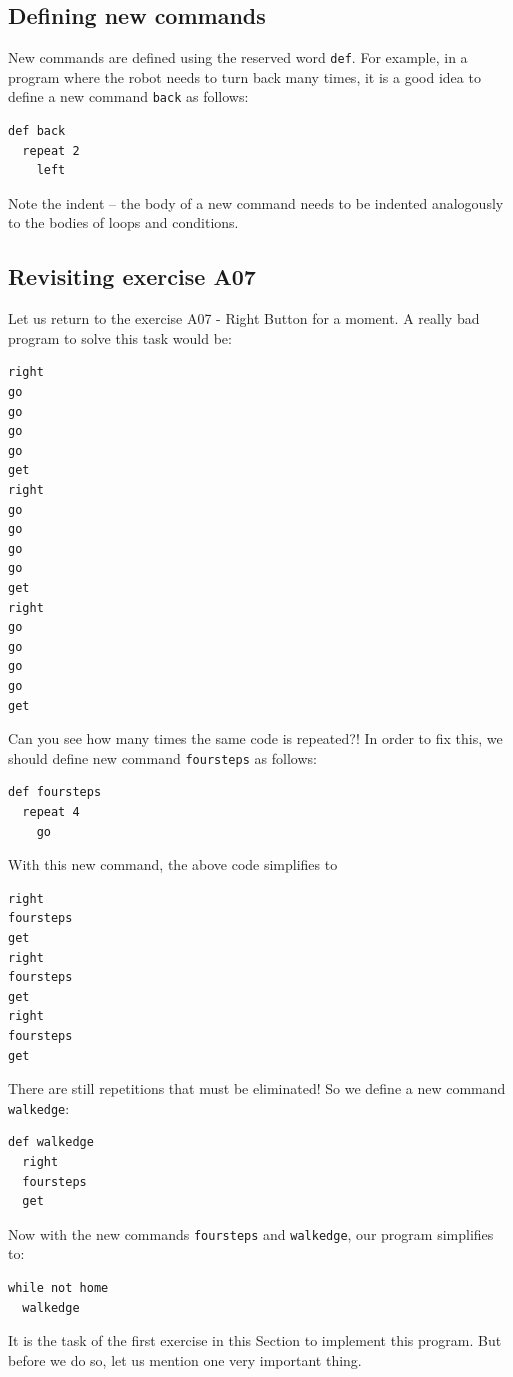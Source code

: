 \documentclass[article,A4,12pt]{llncs}
\begin{document}
\subsection{Defining new commands}

New commands are defined using the reserved word 
{\tt def}. For example, in a program where the robot needs to turn back
many times, it is a good idea to define a new command {\tt back}
as follows:

\begin{verbatim}
def back
  repeat 2
    left
\end{verbatim}
Note the indent -- the body of a new command needs to be indented 
analogously to the bodies of loops and conditions.

\subsection{Revisiting exercise A07}

Let us return to the exercise A07 - Right Button for a moment.
A really bad program to solve this task would be:

{\small
\begin{verbatim}
right
go
go
go
go 
get
right
go
go
go
go 
get
right
go
go
go
go
get
\end{verbatim}
}
\noindent
Can you see how many times the same code is repeated?! In order to fix this, 
we should define new command {\tt foursteps} as
follows:

{\small
\begin{verbatim}
def foursteps
  repeat 4
    go
\end{verbatim}
}
\noindent
With this new command, the above code simplifies to 

{\small
\begin{verbatim}
right
foursteps
get
right
foursteps
get
right
foursteps
get
\end{verbatim}
}
\noindent
There are still repetitions that must be eliminated! So we define a new command 
{\tt walkedge}:

{\small
\begin{verbatim}
def walkedge
  right
  foursteps
  get
\end{verbatim}
}
\noindent
Now with the new commands {\tt foursteps} and
{\tt walkedge}, our program simplifies to:

{\small
\begin{verbatim}
while not home
  walkedge
\end{verbatim}
}
\noindent
It is the task of the first exercise in this Section to implement this program. But before we 
do so, let us mention one very important thing.
\end{document}
